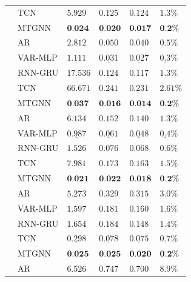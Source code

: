 \begin{table}[bt]
{\begin{tabular}{ *6l }
    & TCN & $5.929$ & $0.125$ & $0.124$ & $1.3\%$\\
    & MTGNN & $\textbf{0.024}$ & $\textbf{0.020}$ & $\textbf{0.017}$ & $\textbf{0.2}\%$\\
    \midrule
     & AR & $2.812$ & $0.050$ & $0.040$ & $0.5\%$ \\
    & VAR-MLP & $\underline{1.111}$ & $\underline{0.031}$ & $\underline{0.027}$ & $\underline{0.3}\%$ \\
    & RNN-GRU & $17.536$ & $0.124$ & $0.117$ & $1.3\%$\\
    & TCN & $66.671$ & $0.241$ & $0.231$ & $2.61\%$ \\
    & MTGNN & $\textbf{0.037}$ & $\textbf{0.016}$ & $\textbf{0.014}$ & $\textbf{0.2}\%$\\
    \midrule
     & AR & $6.134$ & $0.152$ & $0.140$ & $1.3\%$ \\
    & VAR-MLP & $\underline{0.987}$ & $\underline{0.061}$ & $\underline{0.048}$ & $\underline{0.4}\%$ \\
    & RNN-GRU & $1.526$ & $0.076$ & $0.068$ & $0.6\%$\\
    & TCN & $7.981$ & $0.173$ & $0.163$ & $1.5\%$\\
    & MTGNN & $\textbf{0.021}$ & $\textbf{0.022}$ & $\textbf{0.018}$ & $\textbf{0.2}\%$\\
    \midrule
     & AR & $5.273$ & $0.329$ & $0.315$ & $3.0\%$ \\
    & VAR-MLP & $1.597$ & $0.181$ & $0.160$ & $1.6\%$ \\
    & RNN-GRU & $1.654$ & $0.184$ & $0.148$ & $1.4\%$\\
    & TCN & $\underline{0.298}$ & $\underline{0.078}$ & $\underline{0.075}$ & $\underline{0.7}\%$\\
    & MTGNN & $\textbf{0.025}$ & $\textbf{0.025}$ & $\textbf{0.020}$ & $\textbf{0.2}\%$\\
    \midrule
     & AR & $6.526$ & $0.747$ & $0.700$ & $8.9\%$ \\

\end{tabular}}
\end{table}
